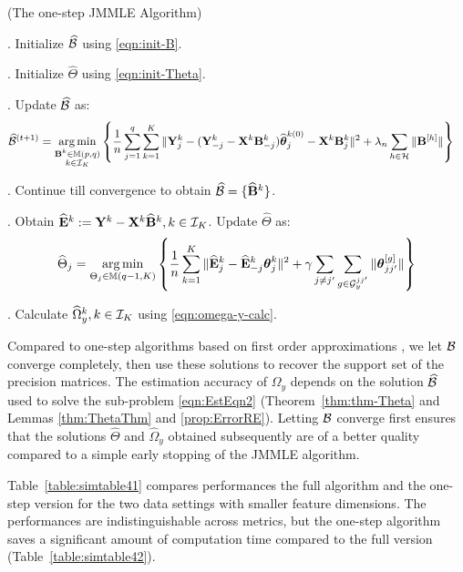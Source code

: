 \begin{Algorithm}
(The one-step JMMLE Algorithm)
\label{algo:jmmle-algo-1step}

. Initialize $\widehat {{\cal{B}}}$ using \eqref{eqn:init-B}.

. Initialize $\widehat \Theta$ using \eqref{eqn:init-Theta}.

. Update $\widehat {{\cal{B}}}$ as:
%
\begin{align*}
\widehat {{\cal{B}}}^{(t+1)} &= \operatorname*{arg\,min}_{\substack{{\mathbf{B}}^k \in {\mathbb{M}}(p,q)\\k \in {\cal{I}}_K}} \left\{ \frac{1}{n} \sum_{j=1}^q \sum_{k=1}^K \| {\mathbf{Y}}^k_j - ({\mathbf{Y}}_{-j}^k - {\mathbf{X}}^k {\mathbf{B}}_{-j}^k) \widehat {{\boldsymbol{\theta}}}_j^{k (0)} - {\mathbf{X}}^k {\mathbf{B}}_j^{k } \|^2
+ \lambda_n \sum_{h \in {\cal{H}}} \| {\mathbf{B}}^{[h]} \| \right\}
\end{align*}

. Continue till convergence to obtain $\widehat {{\cal{B}}} = \{ \widehat {{\mathbf{B}}}^k \}$.

. Obtain $\widehat {{\mathbf{E}}}^k := {\mathbf{Y}}^k - {\mathbf{X}}^k \widehat {{\mathbf{B}}}^k, k \in {\cal{I}}_K$. Update $\widehat \Theta$ as:
%
\begin{align*}
\widehat \Theta_j = \operatorname*{arg\,min}_{\Theta_j \in {\mathbb{M}}(q-1, K)}
\left\{ \frac{1}{n} \sum_{k=1}^K
\| \widehat {{\mathbf{E}}}_j^k - \widehat {{\mathbf{E}}}_{-j}^k {\boldsymbol{\theta}}_j^k \|^2
+ \gamma \sum_{j \neq j'} \sum_{g \in {\cal{G}}_y^{jj'}} \| {\boldsymbol{\theta}}_{jj'}^{[g]} \| \right\}
\end{align*}

. Calculate $\widehat \Omega_y^k, k \in {\cal{I}}_K$ using \eqref{eqn:omega-y-calc}.
\end{Algorithm}

Compared to one-step algorithms based on first order approximations \citep{ZouLi08,Taddy17}, we let ${\cal{B}}$ converge completely, then use these solutions to recover the support set of the precision matrices. The estimation accuracy of $\Omega_y$ depends on the solution $\widehat {{\cal{B}}}$ used to solve the sub-problem \eqref{eqn:EstEqn2} (Theorem~\ref{thm:thm-Theta} and Lemmas \ref{thm:ThetaThm} and \ref{prop:ErrorRE}). Letting ${\cal{B}}$ converge first ensures that the solutions $\widehat \Theta$ and $\widehat \Omega_y$ obtained subsequently are of a better quality compared to a simple early stopping of the JMMLE algorithm.

Table~\ref{table:simtable41} compares performances the full algorithm and the one-step version for the two data settings with smaller feature dimensions. The performances are indistinguishable across metrics, but the one-step algorithm saves a significant amount of computation time compared to the full version (Table~\ref{table:simtable42}).

